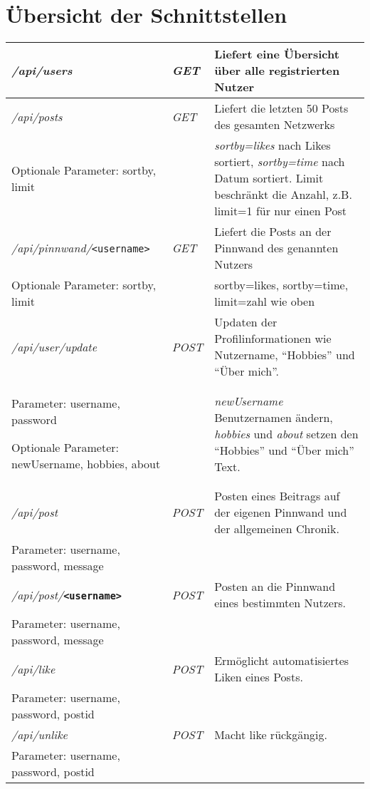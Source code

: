 \documentclass[parskip=half*]{scrartcl}
\begin{document}
\section*{Übersicht der Schnittstellen}
\bgroup
\def\arraystretch{1.5}%
\begin{table}[ht]
\begin{center}
\begin{tabular}{|L{7cm}|C{1.2cm}|L{7cm}|}\hline
\emph{/api/users} & \emph{GET} & Liefert eine Übersicht über alle registrierten Nutzer\\\hline

\emph{/api/posts} & \emph{GET} & Liefert die letzten 50 Posts des gesamten Netzwerks\\ 
Optionale Parameter: sortby, limit & & \emph{sortby=likes} nach Likes sortiert, \emph{sortby=time} nach Datum sortiert. Limit beschränkt die Anzahl, z.B. limit=1 für nur einen Post\\ \hline

\emph{/api/pinnwand/}\texttt{<username>} & \emph{GET} & Liefert die Posts an der Pinnwand des genannten Nutzers\\
Optionale Parameter: sortby, limit & & sortby=likes, sortby=time, limit=zahl wie oben\\ \hline\hline

\emph{/api/user/update} & \emph{POST} & Updaten der Profilinformationen wie Nutzername, \enquote{Hobbies} und \enquote{Über mich}.\\
Parameter: username, password

Optionale Parameter: newUsername, hobbies, about & & \emph{newUsername} Benutzernamen ändern, \emph{hobbies} und \emph{about} setzen den \enquote{Hobbies} und \enquote{Über mich} Text.\\ \hline

\emph{/api/post} & \emph{POST} & Posten eines Beitrags auf der eigenen Pinnwand und der allgemeinen Chronik.\\
Parameter: username, password, message & & \\ \hline

\emph{/api/post/}\textbf{\texttt{<username>}} & \emph{POST} & Posten an die Pinnwand eines bestimmten Nutzers. \\
Parameter: username, password, message & &\\\hline

\emph{/api/like} & \emph{POST} & Ermöglicht automatisiertes Liken eines Posts.\\
Parameter: username, password, postid & & \\\hline
\emph{/api/unlike} & \emph{POST} & Macht like rückgängig.\\ 
Parameter: username, password, postid & & \\\hline

\end{tabular}	
\end{center}
\end{table}
\egroup
\end{document}
